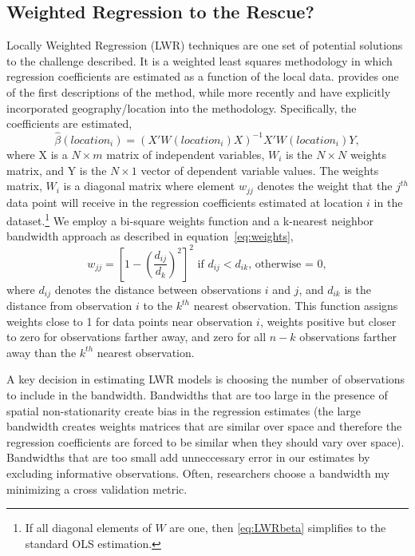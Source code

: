\documentclass{article}\usepackage[]{graphicx}\usepackage[]{color}
\begin{document}
\subsection{Weighted Regression to the Rescue?}
Locally Weighted Regression (LWR) techniques are one set of potential solutions to the challenge described. It is a weighted least squares methodology in which regression coefficients are estimated as a function of the local data. \citet{Cleveland1988} provides one of the first descriptions of the method, while more recently \citet{Brunsdon1998b} and \citet{Fotheringham2002} have explicitly incorporated geography/location into the methodology. Specifically, the coefficients are estimated,
\begin{equation}\label{eq:LWRbeta}
\hat{\beta}(location_i) = (X'W(location_i)X)^{-1}X'W(location_i)Y,
\end{equation}
where X is a $N \times m$ matrix of independent variables, $W_i$ is the $N \times N$ weights matrix, and Y is the $N \times 1$ vector of dependent variable values. The weights matrix, $W_i$ is a diagonal matrix where element $w_{jj}$ denotes the weight that the $j^{th}$ data point will receive in the regression coefficients estimated at location $i$ in the dataset.\footnote{If all diagonal elements of $W$ are one, then \eqref{eq:LWRbeta} simplifies to the standard OLS estimation.} We employ a bi-square weights function and a k-nearest neighbor bandwidth approach as described in equation~\eqref{eq:weights}, 
\begin{equation}\label{eq:weights}
w_{jj}=\left[1-\left(\frac{d_{ij}}{d_{k}}\right)^2 \right]^2 \textrm{ if }d_{ij}<d_{ik}\textrm{, otherwise = 0},
\end{equation}
where $d_{ij}$ denotes the distance between observations $i$ and $j$, and $d_{ik}$ is the distance from observation $i$ to the $k^{th}$ nearest observation. This function assigns weights close to 1 for data points near observation $i$, weights positive but closer to zero for observations farther away, and zero for all $n-k$ observations farther away than the $k^{th}$ nearest observation. 

A key decision in estimating LWR models is choosing the number of observations to include in the bandwidth. Bandwidths that are too large in the presence of spatial non-stationarity create bias in the regression estimates (the large bandwidth creates weights matrices that are similar over space and therefore the regression coefficients are forced to be similar when they should vary over space). Bandwidths that are too small add unneccessary error in our estimates by excluding informative observations. Often, researchers choose a bandwidth my minimizing a cross validation metric. 
\end{document}
